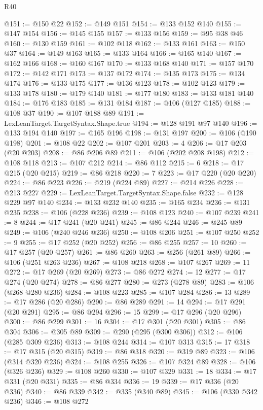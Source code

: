 \begin{lexlean}{R40}
\begin{coremodule}
@151 := @150 @22
@152 := @149 @151
@154 := @133 @152 @140
@155 := @147 @154
@156 := @145 @155
@157 := @133 @156
@159 := @95 @38 @46
@160 := @130 @159
@161 := @102 @118
@162 := @133 @161
@163 := @150 @37
@164 := @149 @163
@165 := @133 @164
@166 := @165 @140
@167 := @162 @166
@168 := @160 @167
@170 := @133 @168 @140
@171 := @157 @170
@172 := @142 @171
@173 := @137 @172
@174 := @135 @173
@175 := @134 @174
@176 := @133 @175
@177 := @136 @123
@178 := @102 @123
@179 := @133 @178
@180 := @179 @140
@181 := @177 @180
@183 := @133 @181 @140
@184 := @176 @183
@185 := @131 @184
@187 := @106 (@127 @185)
@188 := @108 @37
@190 := @107 @188 @89
@191 := LexLeanTarget.TargetSyntax.Shape.true
@194 := @128 @191 @97 @140
@196 := @133 @194 @140
@197 := @165 @196
@198 := @131 @197
@200 := @106 (@190 @198)
@201 := @108 @22
@202 := @107 @201
@203 := 4
@206 := @17 @203 (@20 @203)
@208 := @86 @206 @89
@211 := @106 (@202 @208 @198)
@212 := @108 @118
@213 := @107 @212
@214 := @86 @112
@215 := 6
@218 := @17 @215 (@20 @215)
@219 := @86 @218
@220 := 7
@223 := @17 @220 (@20 @220)
@224 := @86 @223
@226 := @219 (@224 @89)
@227 := @214 @226
@228 := @213 @227
@229 := LexLeanTarget.TargetSyntax.Shape.false
@232 := @128 @229 @97 @140
@234 := @133 @232 @140
@235 := @165 @234
@236 := @131 @235
@238 := @106 (@228 @236)
@239 := @108 @123
@240 := @107 @239
@241 := 8
@244 := @17 @241 (@20 @241)
@245 := @86 @244
@246 := @245 @89
@249 := @106 (@240 @246 @236)
@250 := @108 @206
@251 := @107 @250
@252 := 9
@255 := @17 @252 (@20 @252)
@256 := @86 @255
@257 := 10
@260 := @17 @257 (@20 @257)
@261 := @86 @260
@263 := @256 (@261 @89)
@266 := @106 (@251 @263 @236)
@267 := @108 @218
@268 := @107 @267
@269 := 11
@272 := @17 @269 (@20 @269)
@273 := @86 @272
@274 := 12
@277 := @17 @274 (@20 @274)
@278 := @86 @277
@280 := @273 (@278 @89)
@283 := @106 (@268 @280 @236)
@284 := @108 @223
@285 := @107 @284
@286 := 13
@289 := @17 @286 (@20 @286)
@290 := @86 @289
@291 := 14
@294 := @17 @291 (@20 @291)
@295 := @86 @294
@296 := 15
@299 := @17 @296 (@20 @296)
@300 := @86 @299
@301 := 16
@304 := @17 @301 (@20 @301)
@305 := @86 @304
@306 := @305 @89
@309 := @290 (@295 (@300 @306))
@312 := @106 (@285 @309 @236)
@313 := @108 @244
@314 := @107 @313
@315 := 17
@318 := @17 @315 (@20 @315)
@319 := @86 @318
@320 := @319 @89
@323 := @106 (@314 @320 @236)
@324 := @108 @255
@326 := @107 @324 @89
@328 := @106 (@326 @236)
@329 := @108 @260
@330 := @107 @329
@331 := 18
@334 := @17 @331 (@20 @331)
@335 := @86 @334
@336 := 19
@339 := @17 @336 (@20 @336)
@340 := @86 @339
@342 := @335 (@340 @89)
@345 := @106 (@330 @342 @236)
@346 := @108 @272

\end{coremodule}
\end{lexlean}
